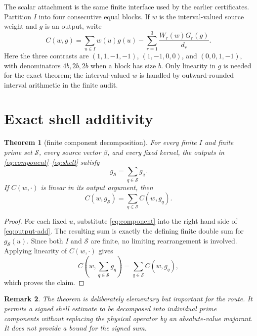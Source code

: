 \documentclass[11pt]{article}
\newtheorem{theorem}{Theorem}
\newtheorem{remark}[theorem]{Remark}
\newcommand{\1}{\mathbf{1}}
\newcommand{\shell}{\mathcal S}
\begin{document}
The scalar attachment is the same finite interface used by the earlier
certificates.  Partition $I$ into four consecutive equal blocks.  If $w$ is
the interval-valued source weight and $g$ is an output, write
\begin{equation}
 C(w,g)=\sum_{u\in I}w(u)g(u)
 -\sum_{r=1}^{3}\frac{W_r(w)G_r(g)}{d_r}.
 \label{eq:attachment}
\end{equation}
Here the three contrasts are
$(1,1,-1,-1)$, $(1,-1,0,0)$, and $(0,0,1,-1)$, with denominators
$4b,2b,2b$ when a block has size $b$.  Only linearity in $g$ is needed for
the exact theorem; the interval-valued $w$ is handled by outward-rounded
interval arithmetic in the finite audit.

\section{Exact shell additivity}

\begin{theorem}[finite component decomposition]
For every finite $I$ and finite prime set $\shell$, every source vector $\beta$,
and every fixed kernel, the outputs in \eqref{eq:component}--\eqref{eq:shell}
satisfy
\begin{equation}
 g_{\shell}=\sum_{q\in\shell}g_q.
 \label{eq:output-add}
\end{equation}
If $C(w,\cdot)$ is linear in its output argument, then
\begin{equation}
 C(w,g_{\shell})=\sum_{q\in\shell}C(w,g_q).
 \label{eq:scalar-add}
\end{equation}
\end{theorem}

\begin{proof}
For each fixed $u$, substitute \eqref{eq:component} into the right hand side
of \eqref{eq:output-add}.  The resulting sum is exactly the defining finite
double sum for $g_{\shell}(u)$.  Since both $I$ and $\shell$ are finite, no
limiting rearrangement is involved.  Applying linearity of $C(w,\cdot)$ gives
\begin{equation*}
 C\left(w,\sum_{q\in\shell}g_q\right)
 =\sum_{q\in\shell}C(w,g_q),
\end{equation*}
which proves the claim.
\end{proof}

\begin{remark}
The theorem is deliberately elementary but important for the route.  It
permits a signed shell estimate to be decomposed into individual prime
components without replacing the physical operator by an absolute-value
majorant.  It does not provide a bound for the signed sum.
\end{remark}
\end{document}
